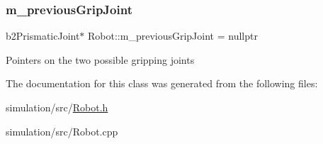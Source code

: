 \subsubsection{\texorpdfstring{m\+\_\+previous\+Grip\+Joint}{m\_previousGripJoint}}
{\footnotesize\ttfamily b2\+Prismatic\+Joint$\ast$ Robot\+::m\+\_\+previous\+Grip\+Joint = nullptr}

Pointers on the two possible gripping joints 

The documentation for this class was generated from the following files\+:\begin{DoxyCompactItemize}
\item 
simulation/src/\mbox{\hyperlink{_robot_8h}{Robot.\+h}}\item 
simulation/src/Robot.\+cpp\end{DoxyCompactItemize}

